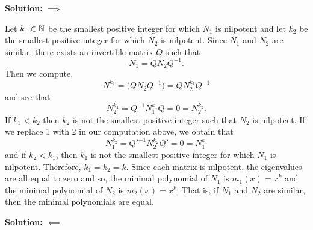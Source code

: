 \documentclass{article}
\begin{document}
\textbf{Solution:} $\implies$ 

Let $k_1\in\mathbb N$ be the smallest positive integer for which $N_1$ is nilpotent and let $k_2$ be the smallest positive integer for which $N_2$ is nilpotent. Since $N_1$ and $N_2$ are similar, there exists an invertible matrix $Q$ such that 
	\[ N_1 = Q N_2 Q^{-1}.\]
Then we compute, 
	\[ N_1^{k_1} = \big( Q N_2 Q^{-1} \big) = Q N_2^{k_1} Q^{-1} \]
and see that 
	\[ N_2 ^{k_1} = Q^{-1} N_1^{k_1} Q = 0 = N_2^{k_2}.\]
If $k_1<k_2$ then $k_2$ is not the smallest positive integer such that $N_2$ is nilpotent. If we replace 1 with 2 in our computation above, we obtain that 
\[N_1 ^{k_2} = Q'^{-1} N_2^{k_2} Q' = 0 = N_1^{k_1}\]
and if $k_2 < k_1$, then $k_1$ is not the smallest positive integer for which $N_1$ is nilpotent. Therefore, $k_1 = k_2 = k$. Since each matrix is nilpotent, the eigenvalues are all equal to zero and so, the minimal polynomial of $N_1$ is $m_1(x) = x^k$ and the minimal polynomial of $N_2$ is $m_2(x) = x^k$. That is, if $N_1$ and $N_2$ are similar, then the minimal polynomials are equal.

\textbf{Solution:} $\impliedby$
\end{document}
